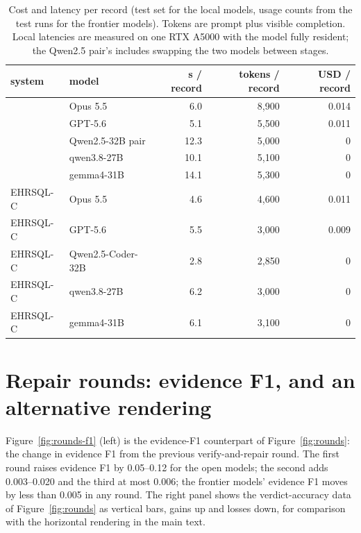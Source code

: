 \begin{table}[htbp]
\centering
\footnotesize
\setlength{\tabcolsep}{3pt}
\begin{tabular}{llrrr}
\toprule
system & model & s / record & tokens / record & USD / record \\
\midrule
\art{} & Opus 5.5 & 6.0 & 8{,}900 & 0.014 \\
\art{} & GPT-5.6 & 5.1 & 5{,}500 & 0.011 \\
\art{} & Qwen2.5-32B pair & 12.3 & 5{,}000 & 0 \\
\art{} & qwen3.8-27B & 10.1 & 5{,}100 & 0 \\
\art{} & gemma4-31B & 14.1 & 5{,}300 & 0 \\
EHRSQL-C & Opus 5.5 & 4.6 & 4{,}600 & 0.011 \\
EHRSQL-C & GPT-5.6 & 5.5 & 3{,}000 & 0.009 \\
EHRSQL-C & Qwen2.5-Coder-32B & 2.8 & 2{,}850 & 0 \\
EHRSQL-C & qwen3.8-27B & 6.2 & 3{,}000 & 0 \\
EHRSQL-C & gemma4-31B & 6.1 & 3{,}100 & 0 \\
\bottomrule
\end{tabular}
\caption{Cost and latency per record (test set for the local models, usage
counts from the test runs for the frontier models). Tokens are prompt plus
visible completion. Local latencies are measured on one RTX A5000 with the
model fully resident; the Qwen2.5 pair's includes swapping the two models
between stages.}
\label{tab:cost}
\end{table}

\iffalse  %
\section{Repair rounds: evidence F1, and an alternative rendering}
\label{app:rounds}
\label{app:rounds-vertical}

Figure~\ref{fig:rounds-f1} (left) is the evidence-F1 counterpart of
Figure~\ref{fig:rounds}: the change in evidence F1 from the previous
verify-and-repair round. The first round raises evidence F1 by 0.05--0.12 for
the open models; the second adds 0.003--0.020 and the third at most 0.006;
the frontier models' evidence F1 moves by less than 0.005 in any round. The
right panel shows the verdict-accuracy data of Figure~\ref{fig:rounds} as
vertical bars, gains up and losses down, for comparison with the horizontal
rendering in the main text.

